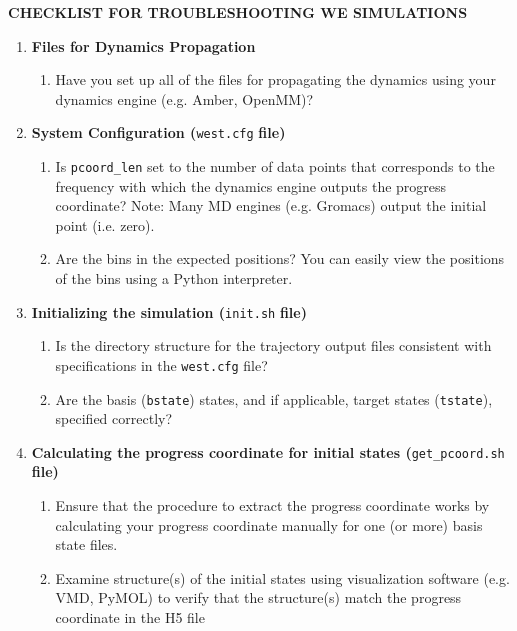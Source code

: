 \documentclass[9pt,tutorial,pubversion]{livecoms}
\begin{document}
\newpage
\begin{center}
\begin{LARGE}
    \textbf{CHECKLIST FOR TROUBLESHOOTING WE SIMULATIONS}
\end{LARGE}
\end{center}

\renewcommand{\labelenumi}{}
\renewcommand{\labelenumii}{$\square$}
\begin{enumerate}
\item \textbf{Files for Dynamics Propagation}
\begin{enumerate}
\item Have you set up all of the files for propagating the dynamics using your dynamics engine (e.g. Amber, OpenMM)? 
\end{enumerate}
\item \textbf{System Configuration (}\verb|west.cfg| \textbf{file)}
\begin{enumerate}
\item Is \verb|pcoord_len| set to the number of data points that corresponds to the frequency with which the dynamics engine outputs the progress coordinate? Note: Many MD engines (e.g. Gromacs) output the initial point (i.e. zero). 
\item Are the bins in the expected positions? You can easily view the positions of the bins using a Python interpreter.
\end{enumerate}
\item \textbf{Initializing the simulation (}\verb|init.sh| \textbf{file)} 
\begin{enumerate}
\item Is the directory structure for the trajectory output files consistent with specifications in the \verb|west.cfg| file? 
\item Are the basis (\verb|bstate|) states, and if applicable, target states (\verb|tstate|), specified correctly?
\end{enumerate}
\item \textbf{Calculating the progress coordinate for initial states (}\verb|get_pcoord.sh| \textbf{file)}
\begin{enumerate}
\item Ensure that the procedure to extract the progress coordinate works by calculating your progress coordinate manually for one (or more) basis state files. 
\item Examine structure(s) of the initial states using visualization software (e.g. VMD, PyMOL) to verify that the structure(s) match the progress coordinate in the H5 file 

\end{enumerate}
\end{enumerate}
\end{document}
